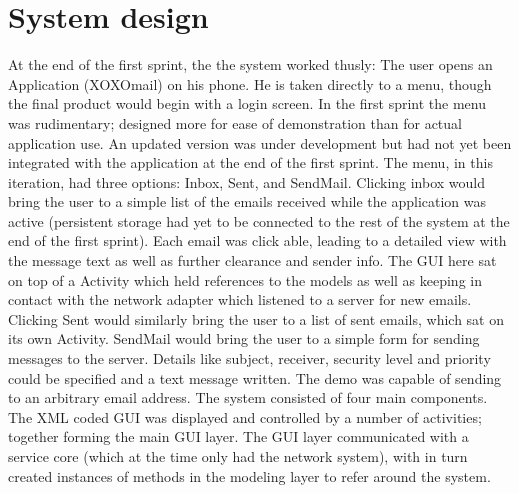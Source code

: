 \section{System design}
At the end of the first sprint, the the system worked thusly: The user opens an Application (XOXOmail) on his phone. He is taken directly to a menu, though the final product would begin with a login screen. In the first sprint the menu was rudimentary; designed more for ease of demonstration than for actual application use. An updated version was under development but had not yet been integrated with the application at the end of the first sprint. The menu, in this iteration, had three options: Inbox, Sent, and SendMail.
\newline
\newline
Clicking inbox would bring the user to a simple list of the emails received while the application was active (persistent storage had yet to be connected to the rest of the system at the end of the first sprint). Each email was click able, leading to a detailed view with the message text as well as further clearance and sender info. The GUI here sat on top of a Activity which held references to the models as well as keeping in contact with the network adapter which listened to a server for new emails. Clicking Sent would similarly bring the user to a list of sent emails, which sat on its own Activity.
\newline
\newline
SendMail would bring the user to a simple form for sending messages to the server. Details like subject, receiver, security level and priority could be specified and a text message written. The demo was capable of sending to an arbitrary email address.
\newline
\newline
The system consisted of four main components. The XML coded GUI was displayed and controlled by a number of activities; together forming the main GUI layer. The GUI layer communicated with a service core (which at the time only had the network system), with in turn created instances of methods in the modeling layer to refer around the system.

